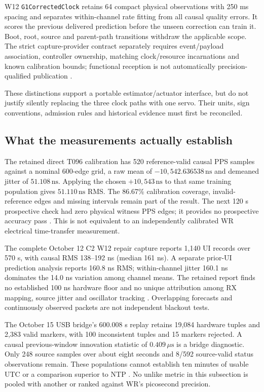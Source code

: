 \documentclass[11pt,letterpaper]{article}
\newcommand{\ns}{\,\mathrm{ns}}
\newcommand{\us}{\,\mu\mathrm{s}}
\newcommand{\code}[1]{\texttt{#1}}
\begin{document}
W12 \code{G1CorrectedClock} retains 64 compact physical observations with 250 ms spacing and separates within-channel rate fitting from all causal quality errors. It scores the previous delivered prediction before the unseen correction can train it. Boot, root, source and parent-path transitions withdraw the applicable scope. The strict capture-provider contract separately requires event/payload association, controller ownership, matching clock/resource incarnations and known calibration bounds; functional reception is not automatically precision-qualified publication \cite{localcode,w12drift}.

These distinctions support a portable estimator/actuator interface, but do not justify silently replacing the three clock paths with one servo. Their units, sign conventions, admission rules and historical evidence must first be reconciled.

\subsection{What the measurements actually establish}
The retained direct T096 calibration has 520 reference-valid causal PPS samples against a nominal 600-edge grid, a raw mean of $-10{,}542.636538\ns$ and demeaned jitter of $51.108\ns$. Applying the chosen $+10{,}543\ns$ to that same training population gives $51.110\ns$ RMS. The 86.67\% calibration coverage, invalid-reference edges and missing intervals remain part of the result. The next 120 s prospective check had zero physical witness PPS edges; it provides no prospective accuracy pass \cite{empirical}. This is not equivalent to an independently calibrated WR electrical time-transfer measurement.

The complete October 12 C2 W12 repair capture reports 1,140 UI records over 570 s, with causal RMS 138--192 ns (median 161 ns). A separate prior-UI prediction analysis reports 160.8 ns RMS; within-channel jitter 160.1 ns dominates the 14.0 ns variation among channel means. The retained report finds no established 100 ns hardware floor and no unique attribution among RX mapping, source jitter and oscillator tracking \cite{w12drift}. Overlapping forecasts and continuously observed packets are not independent blackout tests.

The October 15 USB bridge's 600.008 s replay retains 19,084 hardware tuples and 2,383 valid markers, with 100 inconsistent tuples and 15 markers rejected. A causal previous-window innovation statistic of $0.409\us$ is a bridge diagnostic. Only 248 source samples over about eight seconds and 8/592 source-valid status observations remain. These populations cannot establish ten minutes of usable UTC or a comparison superior to NTP \cite{usb}. No unlike metric in this subsection is pooled with another or ranked against WR's picosecond precision.
\end{document}
